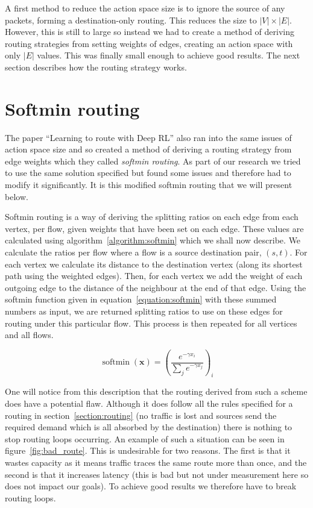 A first method to reduce the action space size is to ignore the source of any packets, forming a destination-only routing. This reduces the size to $|V|\times|E|$. However, this is still to large so instead we had to create a method of deriving routing strategies from setting weights of edges, creating an action space with only $|E|$ values. This was finally small enough to achieve good results. The next section describes how the routing strategy works.

\section{Softmin routing}
The paper ``Learning to route with Deep RL''\cite{valadarsky2017learning} also ran into the same issues of action space size and so created a method of deriving a routing strategy from edge weights which they called \emph{softmin routing}. As part of our research we tried to use the same solution specified but found some issues and therefore had to modify it significantly. It is this modified softmin routing that we will present below.

Softmin routing is a way of deriving the splitting ratios on each edge from each vertex, per flow, given weights that have been set on each edge. These values are calculated using algorithm~\ref{algorithm:softmin} which we shall now describe. We calculate the ratios per flow where a flow is a source destination pair, $(s,t)$. For each vertex we calculate its distance to the destination vertex (along its shortest path using the weighted edges). Then, for each vertex we add the weight of each outgoing edge to the distance of the neighbour at the end of that edge. Using the softmin function given in equation~\ref{equation:softmin} with these summed numbers as input, we are returned splitting ratios to use on these edges for routing under this particular flow. This process is then repeated for all vertices and all flows.

\begin{equation}
  \label{equation:softmin}
  \operatorname{softmin}(\bm{x}) = \left(\frac{e^{-\gamma x_i}}{\sum_{j}{e^{-\gamma x_j}}}\right)_i
\end{equation}

One will notice from this description that the routing derived from such a scheme does have a potential flaw. Although it does follow all the rules specified for a routing in section~\ref{section:routing} (no traffic is lost and sources send the required demand which is all absorbed by the destination) there is nothing to stop routing loops occurring. An example of such a situation can be seen in figure~\ref{fig:bad_route}. This is undesirable for two reasons. The first is that it wastes capacity as it means traffic traces the same route more than once, and the second is that it increases latency (this is bad but not under measurement here so does not impact our goals). To achieve good results we therefore have to break routing loops.

